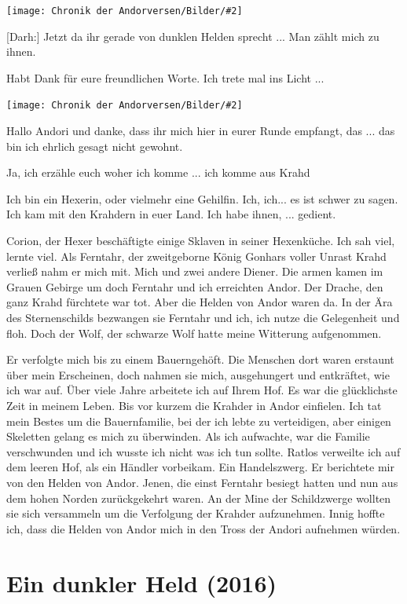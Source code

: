 \documentclass[10pt, a4paper, oneside]{book}
\newcommand{\fillbreak}{\vspace*{\fill}\columnbreak}
\newcommand{\storytext}[1]{%
    \section{#1}%
    \label{Storytext: #1}%
}
\newcommand{\bildmitts}[2][height=0.32\textwidth,width=0.48\textwidth,keepaspectratio]{%
    \begin{center}
        \texttt{[image: Chronik der Andorversen/Bilder/\#2]}
    \end{center}
}
\begin{document}
\begin{multicols}{2}
\bildmitts{Dunkle Helden Darh.jpeg}

[Darh:] Jetzt da ihr gerade von dunklen Helden sprecht ... Man zählt mich zu ihnen.

Habt Dank für eure freundlichen Worte. Ich trete mal ins Licht ...

\bildmitts{Darh (2016).jpg}

Hallo Andori und danke, dass ihr mich hier in eurer Runde empfangt, das ... das bin ich ehrlich gesagt nicht gewohnt.

Ja, ich erzähle euch woher ich komme ... ich komme aus Krahd

Ich bin ein Hexerin, oder vielmehr eine Gehilfin. Ich, ich... es ist schwer zu sagen. Ich kam mit den Krahdern in euer Land. Ich habe ihnen, ... gedient.

Corion, der Hexer beschäftigte einige Sklaven in seiner Hexenküche. Ich sah viel, lernte viel. Als Ferntahr, der zweitgeborne König Gonhars voller Unrast Krahd verließ nahm er mich mit. Mich und zwei andere Diener. Die armen kamen im Grauen Gebirge um doch Ferntahr und ich erreichten Andor. Der Drache, den ganz Krahd fürchtete war tot. Aber die Helden von Andor waren da. In der Ära des Sternenschilds bezwangen sie Ferntahr und ich, ich nutze die Gelegenheit und floh. Doch der Wolf, der schwarze Wolf hatte meine Witterung aufgenommen.

Er verfolgte mich bis zu einem Bauerngehöft. Die Menschen dort waren erstaunt über mein Erscheinen, doch nahmen sie mich, ausgehungert und entkräftet, wie ich war auf. Über viele Jahre arbeitete ich auf Ihrem Hof. Es war die glücklichste Zeit in meinem Leben. Bis vor kurzem die Krahder in Andor einfielen. Ich tat mein Bestes um die Bauernfamilie, bei der ich lebte zu verteidigen, aber einigen Skeletten gelang es mich zu überwinden. Als ich aufwachte, war die Familie verschwunden und ich wusste ich nicht was ich tun sollte. Ratlos verweilte ich auf dem leeren Hof, als ein Händler vorbeikam. Ein Handelszwerg. Er berichtete mir von den Helden von Andor. Jenen, die einst Ferntahr besiegt hatten und nun aus dem hohen Norden zurückgekehrt waren. An der Mine der Schildzwerge wollten sie sich versammeln um die Verfolgung der Krahder aufzunehmen. Innig hoffte ich, dass die Helden von Andor mich in den Tross der Andori aufnehmen würden.








\fillbreak
\storytext{Ein dunkler Held (2016)}


\end{multicols}
\end{document}
